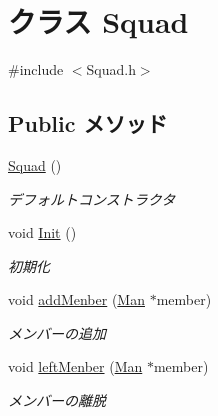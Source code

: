 \hypertarget{class_squad}{\section{クラス Squad}
\label{class_squad}
}


{\ttfamily \#include $<$Squad.\-h$>$}

\subsection*{Public メソッド}
\begin{DoxyCompactItemize}
\item 
\hyperlink{class_squad_a0e37f7593f55bff89220ec031d19f5f0}{Squad} ()
\begin{DoxyCompactList}\small\item\em デフォルトコンストラクタ \end{DoxyCompactList}\item 
void \hyperlink{class_squad_ade5f795e12e6e2865640165dfdf3925a}{Init} ()
\begin{DoxyCompactList}\small\item\em 初期化 \end{DoxyCompactList}\item 
void \hyperlink{class_squad_a64b36d986fbbe63d903740be3c2fad0e}{add\-Menber} (\hyperlink{class_man}{Man} $\ast$member)
\begin{DoxyCompactList}\small\item\em メンバーの追加 \end{DoxyCompactList}\item 
void \hyperlink{class_squad_af31356388d3dd04f7adec8894c898f38}{left\-Menber} (\hyperlink{class_man}{Man} $\ast$member)
\begin{DoxyCompactList}\small\item\em メンバーの離脱 \end{DoxyCompactList}\end{DoxyCompactItemize}
{\bf }\par
